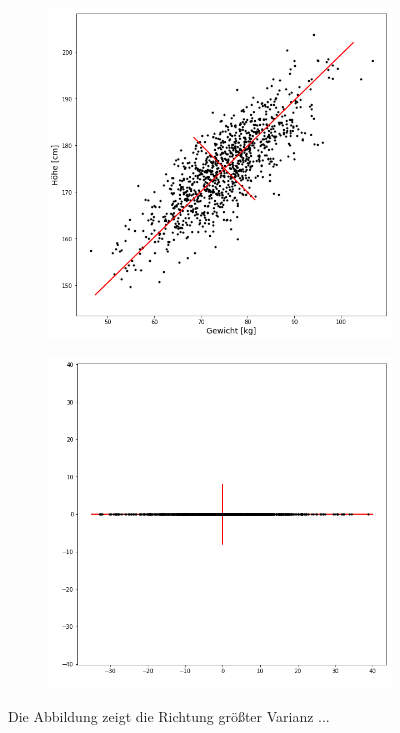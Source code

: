 \begin{figure}
\centering
	\begin{subfigure}{0.45\textwidth}
	\centering
	\includegraphics[width = \textwidth]{figures/pca_example.png}
	\label{pca_example_original}
	\end{subfigure}
	\begin{subfigure}{0.45\textwidth}
	\centering
	\includegraphics[width = \textwidth]{figures/pca_example_rotated.png}
	\label{pca_example_rotated}
	\end{subfigure}

\caption{Die Abbildung zeigt die Richtung größter Varianz ...}
\label{pca_example}
\end{figure}



